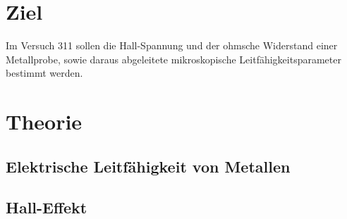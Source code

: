 \section{Ziel}
\label{sec:Ziel}
Im Versuch 311 sollen die Hall-Spannung und der ohmsche Widerstand einer Metallprobe, sowie daraus abgeleitete mikroskopische Leitfähigkeitsparameter bestimmt werden.

\section{Theorie}
\label{sec:theorie}

\subsection{Elektrische Leitfähigkeit von Metallen}
\subsection{Hall-Effekt}
